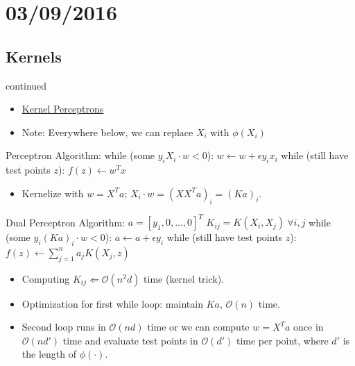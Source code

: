 \documentclass[10pt]{article}
\begin{document}
\section*{03/09/2016}
	\subsection*{Kernels} continued
	\begin{itemize}
		\item \underline{Kernel Perceptrons}
		\item Note: Everywhere below, we can replace $X_{i}$ with $\phi(X_{i})$
		\end{itemize}

\begin{codeblock}
	Perceptron Algorithm:
	    while (some $y_{i}X_{i} \cdot w < 0$):
	        $w \leftarrow w + \epsilon y_{i}x_{i}$
	    while (still have test points $z$):
	        $f(z) \leftarrow w^{T}x$
\end{codeblock}
		\begin{itemize}
		\item Kernelize with $w=X^{T}a$; $X_{i}\cdot w = (XX^{T}a)_{i} = (Ka)_{i}$.
		\end{itemize}

\begin{codeblock}
	Dual Perceptron Algorithm:
	    $a = [y_{1}, 0, \dots, 0]^{T}$
	    $K_{ij} = K(X_{i}, X_{j}) \ \forall i,j$
	    while (some $y_{i}(Ka)_{i} \cdot w < 0$):
	        $a \leftarrow a + \epsilon y_{i}$
	    while (still have test points $z$):
	        $f(z) \leftarrow \sum_{j=1}^{n} a_{j}K(X_{j},z)$
\end{codeblock}
		\begin{itemize}
		\item Computing $K_{ij} \Leftarrow \mathcal{O}(n^{2}d)$ time (kernel trick).
		\item Optimization for first while loop: maintain $Ka$, $\mathcal{O}(n)$ time.
		\item Second loop runs in $\mathcal{O}(nd)$ time or we can compute $w=X^{T}a$ once in $\mathcal{O}(nd')$ time and evaluate test points in $\mathcal{O}(d')$ time per point, where $d'$ is the length of $\phi(\cdot)$.
	\end{itemize}
\end{document}
